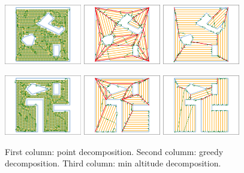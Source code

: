 \documentclass[../main.tex]{subfiles}
\begin{document}
\begin{figure}
		\includegraphics[width=0.3\textwidth]{img/chapter_3/point_12_coverage.png}%
		\includegraphics[width=0.3\textwidth]{img/chapter_3/greedy_12_coverage.pdf}%
		\includegraphics[width=0.3\textwidth]{img/chapter_3/min_12_coverage.pdf}

		\includegraphics[width=0.3\textwidth]{img/chapter_3/point_13_coverage.png}%
		\includegraphics[width=0.3\textwidth]{img/chapter_3/greedy_13_coverage.pdf}%
		\includegraphics[width=0.3\textwidth]{img/chapter_3/min_13_coverage.pdf}
	\caption{First column: point decomposition. Second columm: greedy decomposition. Third column: min altitude decomposition.}
	\label{fig:coverage_results}
\end{figure}
\end{document}
